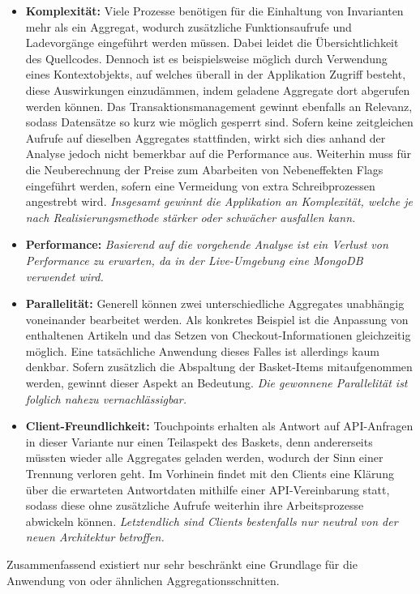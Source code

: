 \begin{itemize}[topsep=-2pt]
	\item \textbf{Komplexität: } {Viele Prozesse benötigen für die Einhaltung von Invarianten mehr als ein Aggregat, wodurch zusätzliche Funktionsaufrufe und Ladevorgänge eingeführt werden müssen. Dabei leidet die Übersichtlichkeit des Quellcodes. Dennoch ist es beispielsweise möglich durch Verwendung eines Kontextobjekts, auf welches überall in der Applikation Zugriff besteht, diese Auswirkungen einzudämmen, indem geladene Aggregate dort abgerufen werden können. Das Transaktionsmanagement gewinnt ebenfalls an Relevanz, sodass Datensätze so kurz wie möglich gesperrt sind. Sofern keine zeitgleichen Aufrufe auf dieselben Aggregates stattfinden, wirkt sich dies anhand der Analyse jedoch nicht bemerkbar auf die Performance aus. Weiterhin muss für die Neuberechnung der Preise zum Abarbeiten von Nebeneffekten Flags eingeführt werden, sofern eine Vermeidung von extra Schreibprozessen angestrebt wird. \emph{Insgesamt gewinnt die Applikation an Komplexität, welche je nach Realisierungsmethode stärker oder schwächer ausfallen kann.}}
	
	\item \textbf{Performance: } { \emph{Basierend auf die vorgehende Analyse ist ein Verlust von Performance zu erwarten, da in der Live-Umgebung eine MongoDB verwendet wird.} }
	
	\item \textbf{Parallelität: } { Generell können zwei unterschiedliche Aggregates unabhängig voneinander bearbeitet werden. Als konkretes Beispiel ist die Anpassung von enthaltenen Artikeln und das Setzen von Checkout-Informationen gleichzeitig möglich. Eine tatsächliche Anwendung dieses Falles ist allerdings kaum denkbar. Sofern zusätzlich die Abspaltung der Basket-Items mitaufgenommen werden, gewinnt dieser Aspekt an Bedeutung. \emph{Die gewonnene Parallelität ist folglich nahezu vernachlässigbar.}}
	\item \textbf{Client-Freundlichkeit: } { Touchpoints erhalten als Antwort auf API-Anfragen in dieser Variante nur einen Teilaspekt des Baskets, denn andererseits müssten wieder alle Aggregates geladen werden, wodurch der Sinn einer Trennung verloren geht. Im Vorhinein findet mit den Clients eine Klärung über die erwarteten Antwortdaten mithilfe einer API-Vereinbarung statt, sodass diese ohne zusätzliche Aufrufe weiterhin ihre Arbeitsprozesse abwickeln können. \emph{Letztendlich sind Clients bestenfalls nur neutral von der neuen Architektur betroffen.}}
\end{itemize}

Zusammenfassend existiert nur sehr beschränkt eine Grundlage für die Anwendung von  oder ähnlichen Aggregationsschnitten.